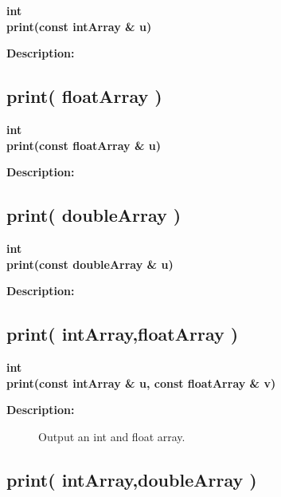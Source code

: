 \begin{flushleft} \textbf{%
int  \\ 
\settowidth{\FortranIOIncludeArgIndent}{print(}%
print(const intArray \& u)
}\end{flushleft}
\begin{description}
\item[{\bf Description:}] 
\end{description}
\subsection{print( floatArray )}
 
\begin{flushleft} \textbf{%
int  \\ 
\settowidth{\FortranIOIncludeArgIndent}{print(}%
print(const floatArray \& u)
}\end{flushleft}
\begin{description}
\item[{\bf Description:}] 
\end{description}
\subsection{print( doubleArray )}
 
\begin{flushleft} \textbf{%
int  \\ 
\settowidth{\FortranIOIncludeArgIndent}{print(}%
print(const doubleArray \& u)
}\end{flushleft}
\begin{description}
\item[{\bf Description:}] 
\end{description}
\subsection{print( intArray,floatArray )}
 
\begin{flushleft} \textbf{%
int  \\ 
\settowidth{\FortranIOIncludeArgIndent}{print(}%
print(const intArray \& u, const floatArray \& v)
}\end{flushleft}
\begin{description}
\item[{\bf Description:}] 
   Output an int and float array.
\end{description}
\subsection{print( intArray,doubleArray )}
 
